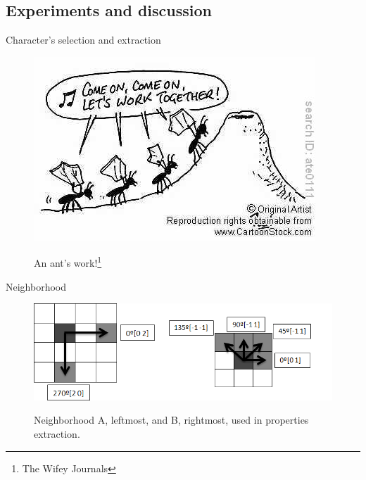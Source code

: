 \documentclass[notes]{beamer}
\begin{document}
\begin{frame}
\section{Experiments and discussion}

\begin{block}{Character's selection and extraction}

\begin{figure}[!htb]
\centering
\includegraphics[scale=0.5]{ants}
\label{fig:ants}
\caption{An ant's work!\footnote{The Wifey Journals\cite{Ants}}}
\end{figure}

\end{block}
{\let\thefootnote\relax\footnotetext{}}
\end{frame}

\begin{frame}

\begin{block}{Neighborhood}

\begin{figure}[!htb]
\centering
\includegraphics[scale=0.3]{neighbor}
\label{fig:neighbor}
\caption{Neighborhood A, leftmost, and B, rightmost, used in
properties extraction.}
\end{figure}

\end{block}

\end{frame}
\end{document}
